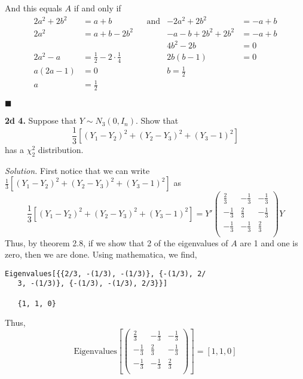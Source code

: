 \documentclass{article}
\begin{document}
And this equals \(A\) if and only if 
\begin{align*}
2a^2+2b^2 &= a+b  &&\text{and}   &             -2a^2+2b^2&= -a+b  \\
2a^2 &= a+b -2b^2 &&&    -a-b+2b^2 + 2b^2&= -a+b\\
&&&&  4b^2-2b &= 0 \\
2a^2-a &= \frac12-2\cdot \frac14   &&& 2b(b-1)&= 0\\
a(2a-1)&= 0&&& b= \frac12\\
a&= \frac12
\end{align*}

\begin{flushright}
\(\blacksquare\)
\end{flushright} 



\newpage
\textbf{2d 4. }  Suppose that \(Y \sim N_3(0, I_n)\). Show that
\[
\frac13[(Y_1-Y_2)^2 + (Y_2-Y_3)^2 + (Y_3-1)^2]
\]has a \(\chi_2^2 \) distribution.  


 \vspace{3mm}
 
 \textit{Solution. } First notice that we can write \(\frac13[(Y_1-Y_2)^2 + (Y_2-Y_3)^2 + (Y_3-1)^2] \) 
 as 
 \[
 \frac13[(Y_1-Y_2)^2 + (Y_2-Y_3)^2 + (Y_3-1)^2] =
 Y' \left(\begin{array}{ccc}
 \frac{2}{3} & -\frac{1}{3} & -\frac{1}{3} \\
 -\frac{1}{3} & \frac{2}{3} & -\frac{1}{3} \\
 -\frac{1}{3} & -\frac{1}{3} & \frac{2}{3} \\
\end{array}
\right) Y
 \]
Thus, by theorem 2.8, if we show that 2 of the eigenvalues of \(A\) are 1 and one is zero, then we are done. 
Using mathematica, we find, 
\begin{verbatim}
Eigenvalues[{{2/3, -(1/3), -(1/3)}, {-(1/3), 2/
   3, -(1/3)}, {-(1/3), -(1/3), 2/3}}]
   
   {1, 1, 0}
\end{verbatim}

Thus, 
\[
\text{Eigenvalues}\left[\left(
\begin{array}{ccc}
 \frac{2}{3} & -\frac{1}{3} & -\frac{1}{3} \\
 -\frac{1}{3} & \frac{2}{3} & -\frac{1}{3} \\
 -\frac{1}{3} & -\frac{1}{3} & \frac{2}{3} \\
\end{array}
\right)\right] = [1,1,0]
\]
\end{document}
